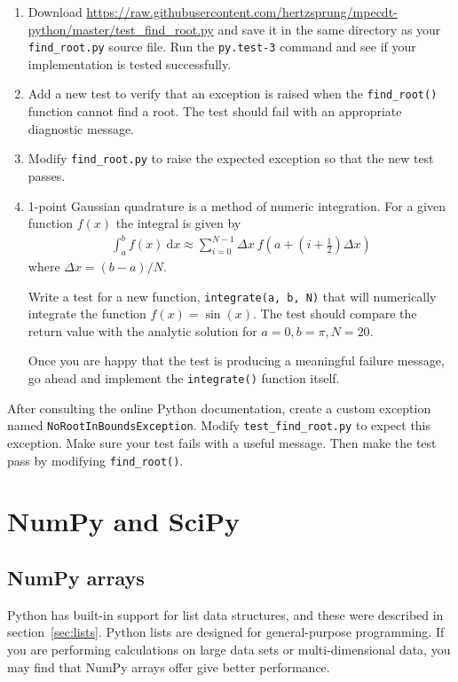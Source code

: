 \documentclass[a4paper,twoside,titlepage]{memoir}
\makeatletter
\newcommand{\FrameTitle}[2]{%
  \fboxrule=\FrameRule \fboxsep=\FrameSep
  \fbox{\vbox{\nobreak \vskip -0.7\FrameSep
    \rlap{\centerline{\strut#1}}\nobreak\nointerlineskip%
    \vskip 0.7\FrameSep
    \hbox{#2}}}}
\newenvironment{framewithtitle}[2][\FrameFirst@Lab\ (cont.)]{%
  \def\FrameFirst@Lab{\textbf{#2}}%
  \def\FrameCont@Lab{\textbf{#1}}%
  \def\FrameCommand##1{%
    \FrameTitle{\FrameFirst@Lab}{##1}}%
  \def\FirstFrameCommand##1{%
    \FrameTitle{\FrameFirst@Lab}{##1}}%
  \def\MidFrameCommand##1{%
    \FrameTitle{\FrameCont@Lab}{##1}}%
  \def\LastFrameCommand##1{%
    \FrameTitle{\FrameCont@Lab}{##1}}%
\MakeFramed{\advance\hsize-\width \FrameRestore}}%
{\endMakeFramed}
\newcounter{exercisectr}
\newenvironment{exercise}
{\stepcounter{exercisectr}\begin{framewithtitle}{Practical \arabic{exercisectr}}}
{\end{framewithtitle}}
\newcommand{\shellcmd}{\texttt}
\newcommand{\additional}{\medskip\noindent{\textit{Additional exercises}}}
\makeatother
\begin{document}
\begin{exercise}
\begin{enumerate}
\item Download \url{https://raw.githubusercontent.com/hertzsprung/mpecdt-python/master/test_find_root.py} and save it in the same directory as your \shellcmd{find\_root.py} source file.  Run the \shellcmd{py.test-3} command and see if your implementation is tested successfully.
\item Add a new test to verify that an exception is raised when the \shellcmd{find\_root()} function cannot find a root.  The test should fail with an appropriate diagnostic message.
\item Modify \shellcmd{find\_root.py} to raise the expected exception so that the new test passes.
\item 1-point Gaussian quadrature is a method of numeric integration.  For a given function $f(x)$ the integral is given by
\begin{align*}
\int_a^b f(x)\:\mathrm{d}x \approx \sum_{i=0}^{N-1} \Delta x\:f \left(a + \left(i + \frac{1}{2} \right) \Delta x \right)
\end{align*}
where $\Delta x = \left( b - a \right) / N$.

Write a test for a new function, \shellcmd{integrate(a, b, N)} that will numerically integrate the function $f(x) = \sin(x)$.  The test should compare the return value with the analytic solution for $a=0, b = \pi, N=20$.

Once you are happy that the test is producing a meaningful failure message, go ahead and implement the \shellcmd{integrate()} function itself.
\end{enumerate}

\additional

After consulting the online Python documentation, create a custom exception named \shellcmd{NoRootInBoundsException}.  Modify \shellcmd{test\_find\_root.py} to expect this exception.  Make sure your test fails with a useful message.  Then make the test pass by modifying \shellcmd{find\_root()}.
\end{exercise}

\chapter{NumPy and SciPy}

\section{NumPy arrays}
Python has built-in support for list data structures, and these were described in section~\ref{sec:lists}.  Python lists are designed for general-purpose programming.
If you are performing calculations on large data sets or multi-dimensional data, you may find that NumPy arrays offer give better performance.
\end{document}
